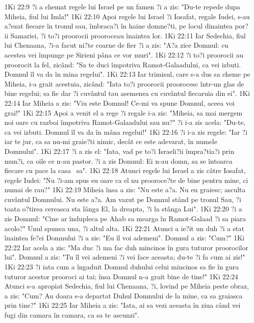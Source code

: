 1Ki 22:9  ?i a chemat regele lui Israel pe un famen ?i a zis: "Du-te repede dupa Miheia, fiul lui Imla!"
1Ki 22:10  Apoi regele lui Israel ?i Iosafat, regale Iudei, s-au a?ezat fiecare în tronul sau, îmbraca?i în haine domne?ti, pe locul dinaintea por?ii Samariei, ?i to?i proorocii prooroceau înaintea lor.
1Ki 22:11  Iar Sedechia, fiul lui Chenaana, ?i-a facut ni?te coarne de fier ?i a zis: "A?a zice Domnul: cu acestea vei împunge pe Sirieni pâna ce vor muri".
1Ki 22:12  ?i to?i proorocii au proorocit la fel, zicând: "Sa te duci împotriva Ramot-Galaadului, ca vei izbuti. Domnul îl va da în mina regelui".
1Ki 22:13  Iar trimisul, care s-a dus sa cheme pe Miheia, i-a grait acestuia, zicând: "Iata to?i proorocii proorocesc într-un glas de bine regelui; sa fie dar ?i cuvântul tau asemenea cu cuvântul fiecaruia din ei".
1Ki 22:14  Iar Miheia a zis: "Viu este Domnul! Ce-mi va spune Domnul, aceea voi grai!"
1Ki 22:15  Apoi a venit el a rege ?i regale i-a zis: "Miheia, sa mai mergem noi oare cu razboi împotriva Ramot-Galaadului sau nu?" ?i i-a zis acela: "Du-te, ca vei izbuti. Domnul îl va da în mâna regelui!"
1Ki 22:16  ?i i-a zis regele: "Iar ?i iar te jur, ca sa nu-mi graie?ti nimic, decât ce este adevarat, în numele Domnului".
1Ki 22:17  ?i a zis el: "Iata, vad pe to?i Israeli?ii împra?tia?i prin mun?i, ca oile ce n-au pastor. ?i a zis Domnul: Ei n-au domn, sa se întoarca fiecare cu pace la casa  sa".
1Ki 22:18  Atunci regele lui Israel a zis câtre Iosafat, regele Iudei: "Nu ?i-am spus eu oare ca el nu prooroce?te de bine pentru mine, ci numai de rau?"
1Ki 22:19  Miheia însa a zis: "Nu este a?a. Nu eu graiesc; asculta cuvântul Domnului. Nu este a?a. Am vazut pe Domnul stând pe tronul Sau, ?i toata o?tirea cereasca sta lânga El, la dreapta, ?i la stânga Lui".
1Ki 22:20  ?i a zis Domnul: "Cine ar îndupleca pe Ahab sa mearga în Ramot-Galaad ?i sa piara acolo?" Unul spunea una, ?i altul alta.
1Ki 22:21  Atunci a ie?it un duh ?i a stat înaintea fe?ei Domnului ?i a zis: "Eu îl voi ademeni". Domnul a zis: "Cum?"
1Ki 22:22  Iar acela a zis: "Ma duc ?i ma fac duh mincinos în gura tuturor proorocilor lui". Domnul a zis: "Tu îl vei ademeni ?i vei face aceasta; du-te ?i fa cum ai zis!"
1Ki 22:23  ?i iata cum a îngaduit Domnul duhului celui mincinos sa fie în gura tuturor acestor prooroci ai tai; însa Domnul n-a grait bine de tine!"
1Ki 22:24  Atunci s-a apropiat Sedechia, fiul lui Chenaana, ?i, lovind pe Miheia peste obraz, a zis: "Cum? Au doara s-a departat Duhul Domnului de la mine, ca sa graiasca prin tine?"
1Ki 22:25  Iar Miheia a zis: "Iata, ai sa vezi aceasta în ziua când vei fugi din camara în camara, ca sa te ascunzi".
